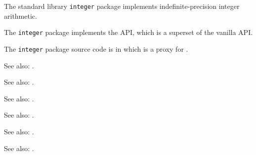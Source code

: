 
The standard library {\tt integer} package implements indefinite-precision integer arithmetic.

The {\tt integer} package implements the  API, 
which is a superset of the vanilla  API.

The {\tt integer} package source code is in  
which is a proxy for .

See also:  .

See also:  .

See also:  .

See also:  .

See also:  .

See also:  .




